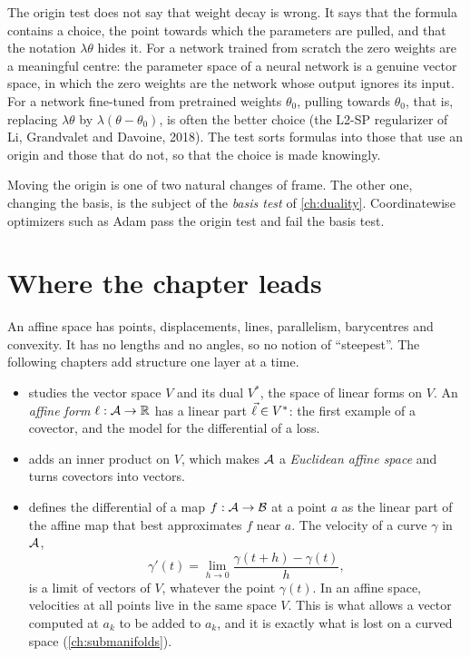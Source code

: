 \begin{notechapter}
\begin{pitfall}
The origin test does not say that weight decay is wrong. It says that the
formula contains a choice, the point towards which the parameters are
pulled, and that the notation $\lambda\theta$ hides it. For a network
trained from scratch the zero weights are a meaningful centre: the
parameter space of a neural network is a genuine vector space, in which
the zero weights are the network whose output ignores its input. For a
network fine-tuned from pretrained weights $\theta_0$, pulling towards
$\theta_0$, that is, replacing $\lambda\theta$ by $\lambda(\theta - \theta_0)$,
is often the better choice (the L2-SP regularizer of Li, Grandvalet and
Davoine, 2018). The test sorts formulas into those that use an origin and
those that do not, so that the choice is made knowingly.
\end{pitfall}

Moving the origin is one of two natural changes of frame. The other one,
changing the basis, is the subject of the \emph{basis test} of
\cref{ch:duality}. Coordinatewise optimizers such as Adam pass the origin
test and fail the basis test.

\section{Where the chapter leads}\label{affine-spaces:sec:outlook}

An affine space has points, displacements, lines, parallelism, barycentres
and convexity. It has no lengths and no angles, so no notion of
``steepest''. The following chapters add structure one layer at a time.
\begin{itemize}[nosep]
  \item {} studies the vector space $V$ and its dual $V^*$,
        the space of linear forms on $V$. An \emph{affine form}
        $\ell:\mathcal{A}\to\mathbb{R}$ has a linear part $\vec{\ell}\in V^*$: the first
        example of a covector, and the model for the differential of a
        loss.
  \item {} adds an inner product on $V$, which makes
        $\mathcal{A}$ a \emph{Euclidean affine space} and turns covectors into
        vectors.
  \item {} defines the differential of a map
        $f:\mathcal{A}\to\mathcal{B}$ at a point $a$ as the linear part of the affine map
        that best approximates $f$ near $a$. The velocity of a curve
        $\gamma$ in $\mathcal{A}$,
        \[
          \gamma'(t) = \lim_{h\to0}\frac{\gamma(t + h) - \gamma(t)}h ,
        \]
        is a limit of vectors of $V$, whatever the point $\gamma(t)$. In an
        affine space, velocities at all points live in the same space $V$.
        This is what allows a vector computed at $a_k$ to be added to
        $a_k$, and it is exactly what is lost on a curved space
        (\cref{ch:submanifolds}).
\end{itemize}


\end{notechapter}
